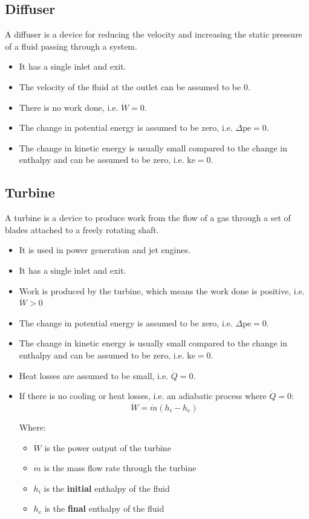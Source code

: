 \documentclass[11pt]{article}
\begin{document}
\subsection{Diffuser}
\label{sec:orgad23005}
A diffuser is a device for reducing the velocity and increasing the static pressure of a fluid passing through a system.
\begin{itemize}
\item It has a single inlet and exit.
\item The velocity of the fluid at the outlet can be assumed to be \(0\).
\item There is no work done, i.e. \(\dot{W} = 0\).
\item The change in potential energy is assumed to be zero, i.e. \(\Delta \text{pe} = 0\).
\item The change in kinetic energy is usually small compared to the change in enthalpy and can be assumed to be zero, i.e. \(\text{ke} = 0\).
\end{itemize}

\subsection{Turbine}
\label{sec:org67f0929}
A turbine is a device to produce work from the flow of a gas through a set of blades attached to a freely rotating shaft.
\begin{itemize}
\item It is used in power generation and jet engines.
\item It has a single inlet and exit.
\item Work is produced by the turbine, which means the work done is positive, i.e. \(\dot{W} > 0\)
\item The change in potential energy is assumed to be zero, i.e. \(\Delta \text{pe} = 0\).
\item The change in kinetic energy is usually small compared to the change in enthalpy and can be assumed to be zero, i.e. \(\text{ke} = 0\).
\item Heat losses are assumed to be small, i.e. \(\dot{Q} = 0\).
\item If there is no cooling or heat losses, i.e. an adiabatic process where \(\dot{Q} = 0\):
\[\dot{W} = \dot{m} \left(h_i - h_e \right)\]

Where:
\begin{itemize}
\item \(\dot{W}\) is the power output of the turbine
\item \(\dot{m}\) is the mass flow rate through the turbine
\item \(h_i\) is the \textbf{initial} enthalpy of the fluid
\item \(h_e\) is the \textbf{final} enthalpy of the fluid
\end{itemize}
\end{itemize}
\end{document}
